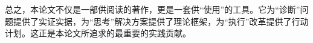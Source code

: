 总之，本论文不仅是一部供阅读的著作，更是一套供“使用”的工具。它为“诊断”问题提供了实证实据，为“思考”解决方案提供了理论框架，为“执行”改革提供了行动计划。这正是本论文所追求的最重要的实践贡献。






















